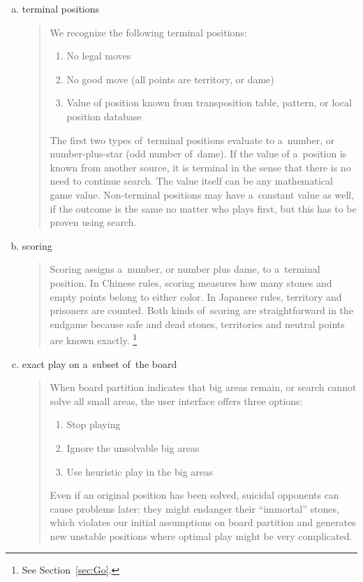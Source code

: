 \begin{enumerate}[(a)]
  \item terminal positions
    \begin{quotation}
      \noindent
      We recognize the following terminal positions:
      \begin{enumerate}[$\diamondsuit$]
        \item No legal moves
        \item No good move (all points are territory, or dame)
        \item Value of position known from transposition table, pattern, or local position database
      \end{enumerate}
      The first two types of~terminal positions evaluate to a~number, or number-plus-star (odd
      number of~dame).
      If the value of a~position is known from another source, it is terminal in the sense that there is no need to continue search.
      The value itself can be any mathematical game value.
      Non-terminal positions may have a~constant value as well, if the outcome is the same no matter who plays first, but this has to be proven using search.
    \end{quotation}

  \item scoring
    \begin{quotation}
      Scoring assigns a~number, or number plus dame, to a~terminal position.
      In Chinese rules, scoring measures how many stones and empty points belong to either color.
      In Japanese rules, territory and prisoners are counted.
      Both kinds of~scoring are straightforward in the endgame because safe and dead stones, territories and neutral points are known exactly.%
      \footnote{See Section~\ref{sec:Go}.}
    \end{quotation}

  \item exact play on a~subset of~the board
    \begin{quotation}
      When board partition indicates that big areas remain, or search cannot solve all small areas, the user interface offers three options:
      \begin{enumerate}[$\diamondsuit$]
        \item Stop playing
        \item Ignore the unsolvable big areas
        \item Use heuristic play in the big areas
      \end{enumerate}
      Even if an original position has been solved, suicidal opponents can cause problems later:
      they might endanger their ``immortal'' stones, which violates our initial assumptions on board partition and generates new unstable positions where optimal play might be very complicated.
    \end{quotation}


\end{enumerate}
